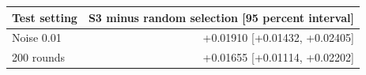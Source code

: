 \begin{tabular}{lr}
\toprule
Test setting & S3 minus random selection [95 percent interval] \\
\midrule
Noise 0.01 & +0.01910 [+0.01432, +0.02405] \\
200 rounds & +0.01655 [+0.01114, +0.02202] \\
\bottomrule
\end{tabular}
